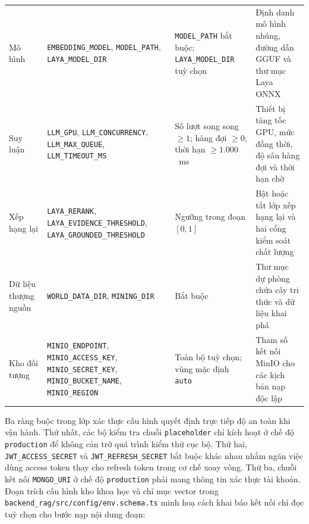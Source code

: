 \begin{longtable}{
  @{}>{\raggedright\arraybackslash}p{2.3cm}
  >{\raggedright\arraybackslash}p{4.3cm}
  >{\raggedright\arraybackslash}p{4.0cm}
  >{\raggedright\arraybackslash}p{4.4cm}@{}
}
Mô hình & \texttt{EMBEDDING\_\allowbreak{}MODEL}, \texttt{MODEL\_\allowbreak{}PATH}, \texttt{LAYA\_\allowbreak{}MODEL\_\allowbreak{}DIR} & \texttt{MODEL\_\allowbreak{}PATH} bắt buộc; \texttt{LAYA\_\allowbreak{}MODEL\_\allowbreak{}DIR} tuỳ chọn & Định danh mô hình nhúng, đường dẫn GGUF và thư mục Laya ONNX \\
Suy luận & \texttt{LLM\_\allowbreak{}GPU}, \texttt{LLM\_\allowbreak{}CONCURRENCY}, \texttt{LLM\_\allowbreak{}MAX\_\allowbreak{}QUEUE}, \texttt{LLM\_\allowbreak{}TIMEOUT\_\allowbreak{}MS} & Số lượt song song $\ge 1$; hàng đợi $\ge 0$; thời hạn $\ge 1.000$~ms & Thiết bị tăng tốc GPU, mức đồng thời, độ sâu hàng đợi và thời hạn chờ \\
Xếp hạng lại & \texttt{LAYA\_\allowbreak{}RERANK}, \texttt{LAYA\_\allowbreak{}EVIDENCE\_\allowbreak{}THRESHOLD}, \texttt{LAYA\_\allowbreak{}GROUNDED\_\allowbreak{}THRESHOLD} & Ngưỡng trong đoạn $[0, 1]$ & Bật hoặc tắt lớp xếp hạng lại và hai cổng kiểm soát chất lượng \\
Dữ liệu thượng nguồn & \texttt{WORLD\_\allowbreak{}DATA\_\allowbreak{}DIR}, \texttt{MINING\_\allowbreak{}DIR} & Bắt buộc & Thư mục dự phòng chứa cây tri thức và dữ liệu khai phá \\
Kho đối tượng & \texttt{MINIO\_\allowbreak{}ENDPOINT}, \texttt{MINIO\_\allowbreak{}ACCESS\_\allowbreak{}KEY}, \texttt{MINIO\_\allowbreak{}SECRET\_\allowbreak{}KEY}, \texttt{MINIO\_\allowbreak{}BUCKET\_\allowbreak{}NAME}, \texttt{MINIO\_\allowbreak{}REGION} & Toàn bộ tuỳ chọn; vùng mặc định \texttt{auto} & Tham số kết nối MinIO cho các kịch bản nạp độc lập \\
\end{longtable}
\endgroup

Ba ràng buộc trong lớp xác thực cấu hình quyết định trực tiếp độ an toàn khi vận hành. Thứ nhất, các bộ kiểm tra chuỗi \texttt{placeholder} chỉ kích hoạt ở chế độ \texttt{production} để không cản trở quá trình kiểm thử cục bộ. Thứ hai, \texttt{JWT\_\allowbreak{}ACCESS\_\allowbreak{}SECRET} và \texttt{JWT\_\allowbreak{}REFRESH\_\allowbreak{}SECRET} bắt buộc khác nhau nhằm ngăn việc dùng access token thay cho refresh token trong cơ chế xoay vòng. Thứ ba, chuỗi kết nối \texttt{MONGO\_\allowbreak{}URI} ở chế độ \texttt{production} phải mang thông tin xác thực tài khoản. Đoạn trích cấu hình kho khoa học và chỉ mục vector trong \texttt{backend\_\allowbreak{}rag/\allowbreak{}src/\allowbreak{}config/\allowbreak{}env.\allowbreak{}schema.\allowbreak{}ts} minh hoạ cách khai báo kết nối chỉ đọc tuỳ chọn cho bước nạp nội dung đoạn:

